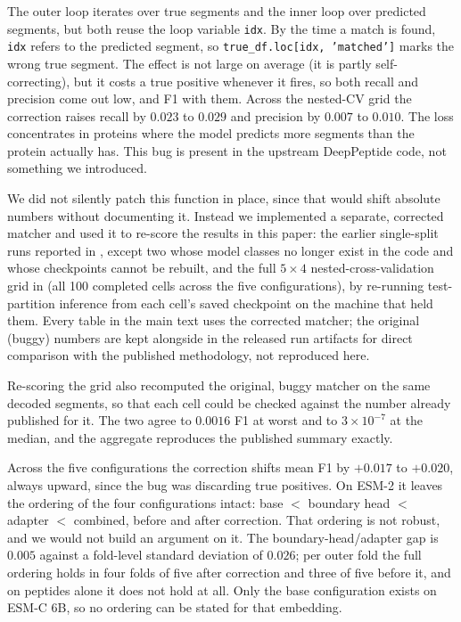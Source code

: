 \documentclass{article}
\begin{document}
The outer loop iterates over true segments and the inner loop over predicted segments, but both reuse the loop variable \texttt{idx}. By the time a match is found, \texttt{idx} refers to the predicted segment, so \texttt{true\_df.loc[idx, 'matched']} marks the wrong true segment. The effect is not large on average (it is partly self-correcting), but it costs a true positive whenever it fires, so both recall and precision come out low, and F1 with them. Across the nested-CV grid the correction raises recall by $0.023$ to $0.029$ and precision by $0.007$ to $0.010$. The loss concentrates in proteins where the model predicts more segments than the protein actually has. This bug is present in the upstream DeepPeptide code, not something we introduced.

We did not silently patch this function in place, since that would shift absolute numbers without documenting it. Instead we implemented a separate, corrected matcher and used it to re-score the results in this paper: the earlier single-split runs reported in , except two whose model classes no longer exist in the code and whose checkpoints cannot be rebuilt, and the full $5\times4$ nested-cross-validation grid in  (all 100 completed cells across the five configurations), by re-running test-partition inference from each cell's saved checkpoint on the machine that held them. Every table in the main text uses the corrected matcher; the original (buggy) numbers are kept alongside in the released run artifacts for direct comparison with the published methodology, not reproduced here.

Re-scoring the grid also recomputed the original, buggy matcher on the same decoded segments, so that each cell could be checked against the number already published for it. The two agree to $0.0016$ F1 at worst and to $3\times10^{-7}$ at the median, and the aggregate reproduces the published summary exactly.

Across the five configurations the correction shifts mean F1 by $+0.017$ to $+0.020$, always upward, since the bug was discarding true positives. On ESM-2 it leaves the ordering of the four configurations intact: base $<$ boundary head $<$ adapter $<$ combined, before and after correction. That ordering is not robust, and we would not build an argument on it. The boundary-head/adapter gap is $0.005$ against a fold-level standard deviation of $0.026$; per outer fold the full ordering holds in four folds of five after correction and three of five before it, and on peptides alone it does not hold at all. Only the base configuration exists on ESM-C 6B, so no ordering can be stated for that embedding.
\end{document}
